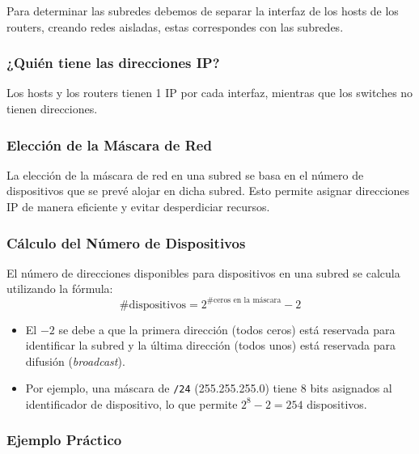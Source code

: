 \documentclass[a4paper,12pt]{article}
\begin{document}
Para determinar las subredes debemos de separar la interfaz de los hosts de los routers, creando redes aisladas, estas correspondes con las subredes.

\subsubsection*{¿Quién tiene las direcciones IP?}
Los hosts y los routers tienen 1 IP por cada interfaz, mientras que los switches no tienen direcciones.

\subsubsection{Elección de la Máscara de Red}

La elección de la máscara de red en una subred se basa en el número de dispositivos que se prevé alojar en dicha subred. Esto permite asignar direcciones IP de manera eficiente y evitar desperdiciar recursos.

\subsubsection*{Cálculo del Número de Dispositivos}

El número de direcciones disponibles para dispositivos en una subred se calcula utilizando la fórmula:
\[
\# \text{dispositivos} = 2^{\# \text{ceros en la máscara}} - 2
\]
\begin{itemize}
    \item El \(-2\) se debe a que la primera dirección (todos ceros) está reservada para identificar la subred y la última dirección (todos unos) está reservada para difusión (\textit{broadcast}).
    \item Por ejemplo, una máscara de \texttt{/24} (255.255.255.0) tiene 8 bits asignados al identificador de dispositivo, lo que permite \(2^8 - 2 = 254\) dispositivos.
\end{itemize}

\subsubsection*{Ejemplo Práctico}
\end{document}

